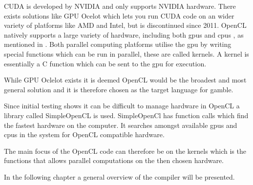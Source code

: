 CUDA is developed by NVIDIA and only supports NVIDIA hardware.
There exists solutions like GPU Ocelot which lets you run CUDA code on an wider variety of platforms like AMD and Intel, but is discontinued since 2011. \citep{Diamos:2010:ODO:1854273.1854318}
OpenCL natively supports a large variety of hardware, including both \acrshort{gpu}s and \acrshort{cpu}s , as mentioned in .
Both parallel computing platforms utilise the \acrshort{gpu} by writing special functions which can be run in parallel, these are called kernels.
A kernel is essentially a C function which can be sent to the \acrshort{gpu} for execution.

While GPU Oclelot exists it is deemed OpenCL would be the broadest and most general solution and it is therefore chosen as the target language for \gls{gamble}.

Since initial testing shows it can be difficult to manage hardware in OpenCL a library called SimpleOpenCL is used.
SimpleOpenCl has function calls which find the fastest hardware on the computer.
It searches amongst available \acrshort{gpu}s and \acrshort{cpu}s in the system for OpenCL compatible hardware. \citep{simpeCL}

The main focus of the OpenCL code can therefore be on the kernels which is the functions that allows parallel computations on the then chosen hardware.

In the following chapter a general overview of the compiler will be presented.
